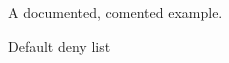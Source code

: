 
\begin{DoxyEnumerate}
\item A documented, comented example.
\item Default deny list 
\end{DoxyEnumerate}